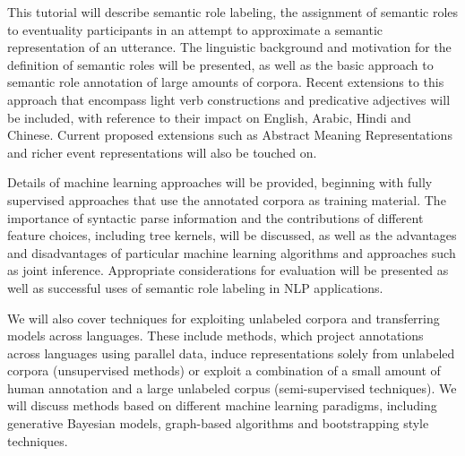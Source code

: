 \noindent
This tutorial will describe semantic role labeling, the assignment of semantic roles to eventuality participants in an attempt to approximate a semantic representation of an utterance. The linguistic background and motivation for the definition of semantic roles will be presented, as well as the basic approach to semantic role annotation of large amounts of corpora. Recent extensions to this approach that encompass light verb constructions and predicative adjectives will be included, with reference to their impact on English, Arabic, Hindi and Chinese. Current proposed extensions such as Abstract Meaning Representations and richer event representations will also be touched on.

Details of machine learning approaches will be provided, beginning with fully supervised approaches that use the annotated corpora as training material. The importance of syntactic parse information and the contributions of different feature choices, including tree kernels, will be discussed, as well as the advantages and disadvantages of particular machine learning algorithms and approaches such as joint inference. Appropriate considerations for evaluation will be presented as well as successful uses of semantic role labeling in NLP applications.

We will also cover techniques for exploiting unlabeled corpora and transferring models across languages. These include methods, which project annotations across languages using parallel data, induce representations solely from unlabeled corpora (unsupervised methods) or exploit a combination of a small amount of human annotation and a large unlabeled corpus (semi-supervised techniques). We will discuss methods based on different machine learning paradigms, including generative Bayesian models, graph-based algorithms and bootstrapping style techniques.
